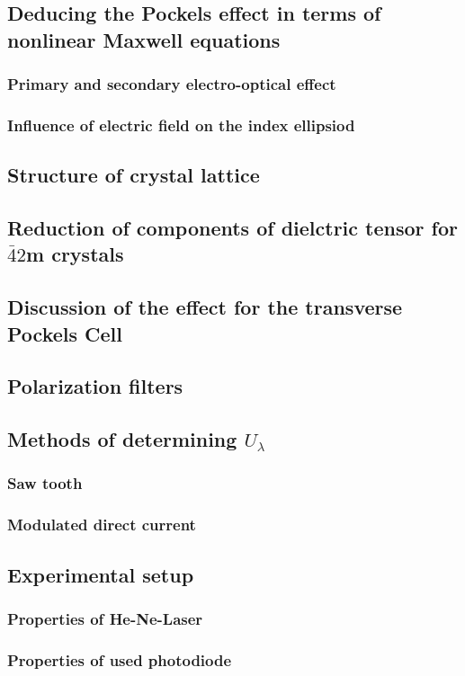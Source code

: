 \subsection{Deducing the Pockels effect in terms of nonlinear Maxwell equations}
\subsubsection{Primary and secondary electro-optical effect}
\subsubsection{Influence of electric field on the index ellipsiod}

\subsection{Structure of crystal lattice}

\subsection{Reduction of components of dielctric tensor for $\bar{4}2$m crystals}

\subsection{Discussion of the effect for the transverse Pockels Cell}

\subsection{Polarization filters}

\subsection{Methods of determining $U_\lambda$}
\subsubsection{Saw tooth}
\subsubsection{Modulated direct current}

\subsection{Experimental setup}
\subsubsection{Properties of He-Ne-Laser}
\subsubsection{Properties of used photodiode}
